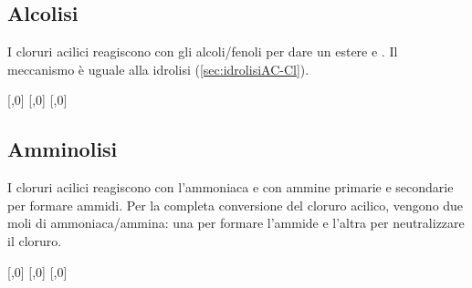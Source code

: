 \subsection{Alcolisi}
I cloruri acilici reagiscono con gli alcoli/fenoli per dare un estere e . Il meccanismo è uguale alla idrolisi (\autoref{sec:idrolisiAC-Cl}).
\begin{reaction}
[,0]
 [,0]\+ 
\arrow
{} [,0]\+ 
\end{reaction}

\subsection{Amminolisi}
I cloruri acilici reagiscono con l'ammoniaca e con ammine primarie e secondarie per formare ammidi. Per la completa conversione del cloruro acilico, vengono due moli di ammoniaca/ammina: una per formare l'ammide e l'altra per neutralizzare il cloruro.
\begin{reaction}
	[,0]
	 [,0] 
	\arrow
	 [,0]\+ 
\end{reaction}